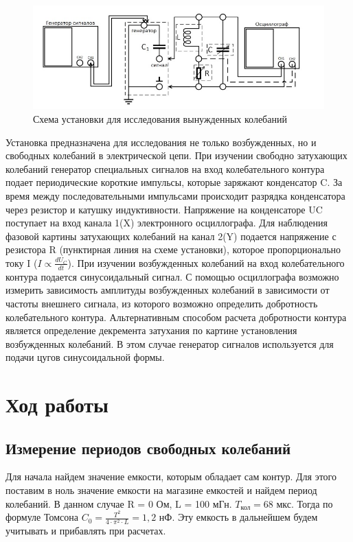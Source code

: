 \documentclass[a4paper,12pt]{article}
\begin{document}
\begin{figure}[H]
	\begin{center}
    		\includegraphics[width=1\textwidth]{schema.jpg}
    		\caption{Схема установки для исследования вынужденных 				колебаний}\label{fig:foobar}
    	\end{center}
\end{figure}
Установка предназначена для исследования не только возбужденных, но и свободных колебаний в электрической цепи. При изучении свободно затухающих колебаний генератор специальных сигналов на вход колебательного контура подает периодические короткие импульсы, которые заряжают конденсатор C. За время между
последовательными импульсами происходит разрядка конденсатора через резистор
и катушку индуктивности. Напряжение на конденсаторе UC поступает на вход канала 1(X) электронного осциллографа. Для наблюдения фазовой картины затухающих
колебаний на канал 2(Y) подается напряжение с резистора R (пунктирная линия на
схеме установки), которое пропорционально току I ($I \propto \frac{dU_C}{dt}$).
При изучении возбужденных колебаний на вход колебательного контура подается
синусоидальный сигнал. С помощью осциллографа возможно измерить зависимость
амплитуды возбужденных колебаний в зависимости от частоты внешнего сигнала,
из которого возможно определить добротность колебательного контура. Альтернативным способом расчета добротности контура является определение декремента
затухания по картине установления возбужденных колебаний. В этом случае генератор сигналов используется для подачи цугов синусоидальной формы.

\section*{Ход работы}
\subsection*{Измерение периодов свободных колебаний}
Для начала найдем значение емкости, которым обладает сам контур. Для этого поставим в ноль значение емкости на магазине емкостей и найдем период колебаний. В данном случае R = 0 Ом, L = 100 мГн. $T_\text{кол} = 68 $ мкс. Тогда по формуле Томсона $C_0 = \frac{T^2}{4 \cdot \pi^2 \cdot L} = 1,2$ нФ. Эту емкость в дальнейшем будем учитывать и прибавлять при расчетах. 
\end{document}
